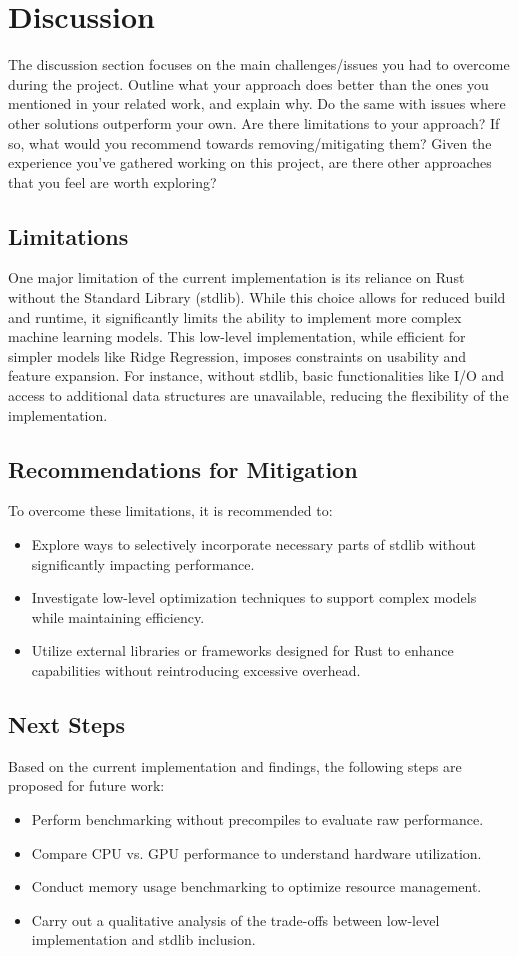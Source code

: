 \documentclass{scrartcl}
\begin{document}
\section{Discussion}
The discussion section focuses on the main challenges/issues you had to overcome during the project. Outline what your approach does better than the ones you mentioned in your related work, and explain why. Do the same with issues where other solutions  outperform your own. Are there limitations to your approach? If so, what would you recommend towards removing/mitigating them? Given the experience you've gathered working on this project, are there other approaches that you feel are worth exploring?

\subsection{Limitations}
One major limitation of the current implementation is its reliance on Rust without the Standard Library (stdlib). While this choice allows for reduced build and runtime, it significantly limits the ability to implement more complex machine learning models. This low-level implementation, while efficient for simpler models like Ridge Regression, imposes constraints on usability and feature expansion. For instance, without stdlib, basic functionalities like I/O and access to additional data structures are unavailable, reducing the flexibility of the implementation.

\subsection{Recommendations for Mitigation}
To overcome these limitations, it is recommended to:
\begin{itemize}
    \item Explore ways to selectively incorporate necessary parts of stdlib without significantly impacting performance.
    \item Investigate low-level optimization techniques to support complex models while maintaining efficiency.
    \item Utilize external libraries or frameworks designed for Rust to enhance capabilities without reintroducing excessive overhead.
\end{itemize}

\subsection{Next Steps}
Based on the current implementation and findings, the following steps are proposed for future work:
\begin{itemize}
    \item Perform benchmarking without precompiles to evaluate raw performance.
    \item Compare CPU vs. GPU performance to understand hardware utilization.
    \item Conduct memory usage benchmarking to optimize resource management.
    \item Carry out a qualitative analysis of the trade-offs between low-level implementation and stdlib inclusion.
\end{itemize}
\end{document}
